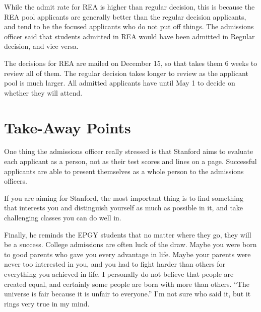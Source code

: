 \documentclass[12pt]{article}
\begin{document}
While the admit rate for REA is higher than regular decision,
this is because the REA pool applicants are generally better than
the regular decision applicants, and tend to be the focused
applicants who do not put off things. 
The admissions officer said that students admitted in REA would have been
admitted in Regular decision, and vice versa.

The decisions for REA are mailed on December 15, so that takes them 6 weeks
to review all of them.
The regular decision takes longer to review as the applicant pool is much larger.
All admitted applicants have until May 1 to decide on whether they will attend. 


\section{Take-Away Points}

One thing the admissions officer really stressed is that
Stanford aims to evaluate each applicant as a person,
not as their test scores and lines on a page.
Successful applicants are able to present themselves as a whole person to the
admissions officers.

If you are aiming for Stanford, the most important thing is to 
find something that interests you and distinguish yourself as 
much as possible in it, and take challenging classes you can do well in. 

Finally, he reminds the EPGY students that no matter where they go,
they will be a success. College admissions are often luck of the draw.
Maybe you were born to good parents who gave you every advantage in life.
Maybe your parents were never too interested in you,
and you had to fight harder than others for everything you achieved in life.
I personally do not believe that people are created equal,
and certainly some people are born with more than others.
``The universe is fair because it is unfair to everyone.'' I'm not sure
who said it, but it rings very true in my mind. 

\end{document}
